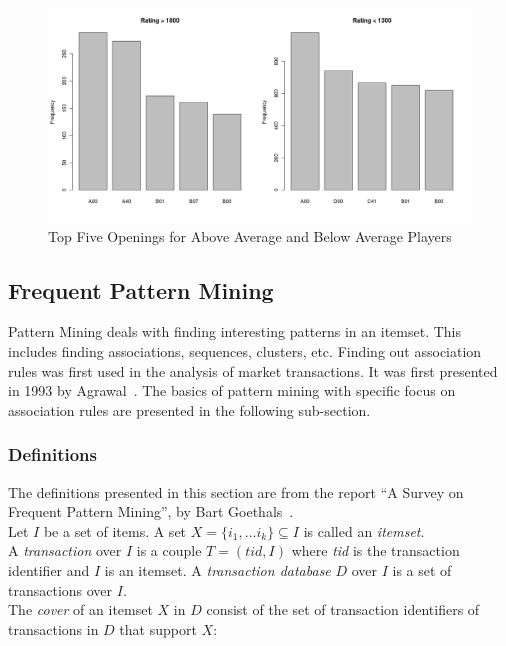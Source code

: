 \documentclass{article}
\begin{document}
\begin{figure} [htp]
\begin{center}
\includegraphics[width=5in]{eco_bar_comp.png}
\end{center}
\caption{Top Five Openings for Above Average and Below Average Players}
\label{fig:ecobarcomp}
\end{figure}


\subsection{Frequent Pattern Mining}
Pattern Mining deals with finding interesting patterns in an itemset. This includes finding associations, sequences, clusters, etc. Finding out association rules was first used in the analysis of market transactions. It was first presented in 1993 by Agrawal~\cite{paper:agrawal}. The basics of pattern mining with specific focus on association rules are presented in the following sub-section.


\subsubsection{Definitions}
The definitions presented in this section are from the report ``A Survey on Frequent Pattern Mining'', by Bart Goethals~\cite{report:patternmining}.\\

Let $I$ be a set of items. A set $X = \{i_1, ... i_k\} \subseteq I$ is called an {\sl itemset}. \\

A {\sl transaction} over $I$ is a couple $T = (tid, I)$ where {\sl tid} is the transaction identifier and $I$ is an itemset. A {\sl transaction database} $D$ over $I$ is a set of transactions over $I$. \\

The {\sl cover} of an itemset $X$ in $D$ consist of the set of transaction identifiers of transactions in $D$ that support $X$:
\end{document}
